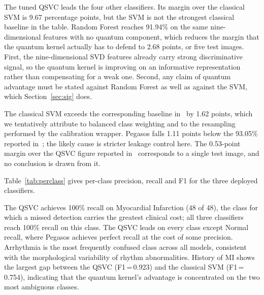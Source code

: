 \documentclass[10pt,conference]{IEEEtran}
\begin{document}
The tuned QSVC leads the four other classifiers. Its margin over the
classical SVM is 9.67 percentage points, but the SVM is not the
strongest classical baseline in the table. Random Forest reaches 91.94\%
on the same nine-dimensional features with no quantum component, which
reduces the margin that the quantum kernel actually has to defend to
2.68 points, or five test images. First, the nine-dimensional SVD
features already carry strong discriminative signal, so the quantum
kernel is improving on an informative representation rather than
compensating for a weak one. Second, any claim of quantum advantage must
be stated against Random Forest as well as against the SVM, which
Section~\ref{sec:sig} does.

The classical SVM exceeds the corresponding baseline in~\cite{prabhu2023}
by 1.62 points, which we tentatively attribute to balanced class
weighting and to the resampling performed by the calibration wrapper.
Pegasos falls 1.11 points below the 93.05\% reported
in~\cite{prabhu2023}; the likely cause is stricter leakage control here.
The 0.53-point margin over the QSVC figure reported in~\cite{prabhu2023}
corresponds to a single test image, and no conclusion is drawn from it.

Table~\ref{tab:perclass} gives per-class precision, recall and F1 for
the three deployed classifiers.

\begin{table}[t]
\caption{Per-Class Precision / Recall / F1 (186-Image Test Set)}
\label{tab:perclass}
\centering
\renewcommand{\arraystretch}{1.1}
\end{table}

The QSVC achieves 100\% recall on Myocardial Infarction (48 of 48), the
class for which a missed detection carries the greatest clinical cost;
all three classifiers reach 100\% recall on this class. The QSVC leads
on every class except Normal recall, where Pegasos achieves perfect
recall at the cost of some precision. Arrhythmia is the most frequently
confused class across all models, consistent with the morphological
variability of rhythm abnormalities. History of MI shows the largest
gap between the QSVC (F1\,=\,0.923) and the classical SVM
(F1\,=\,0.754), indicating that the quantum kernel's advantage is
concentrated on the two most ambiguous classes.
\end{document}
